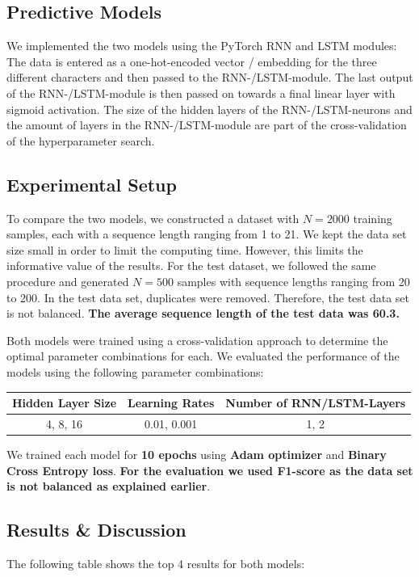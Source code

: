 \documentclass[12pt,a4paper]{article}
\begin{document}
\subsection{Predictive Models}
We implemented the two models using the PyTorch RNN and LSTM modules:
The data is entered as a one-hot-encoded vector / embedding for the three different characters and then passed to the RNN-/LSTM-module. The last output of the RNN-/LSTM-module is then passed on towards a final linear layer with sigmoid activation. The size of the hidden layers of the RNN-/LSTM-neurons and the amount of layers in the RNN-/LSTM-module are part of the cross-validation of the hyperparameter search.
\subsection{Experimental Setup}
To compare the two models, we constructed a dataset with $N=2000$ training samples, each with a sequence length ranging from 1 to 21. We kept the data set size small in order to limit the computing time. However, this limits the informative value of the results. For the test dataset, we followed the same procedure and generated $N=500$ samples with sequence lengths ranging from 20 to 200. In the test data set, duplicates were removed. Therefore, the test data set is not balanced. \textbf{The average sequence length of the test data was 60.3.}

Both models were trained using a cross-validation approach to determine the optimal parameter combinations for each. We evaluated the performance of the models using the following parameter combinations:
\begin{center}
    \begin{tabular}{|c|c|c|}
\hline
Hidden Layer Size & Learning Rates & Number of RNN/LSTM-Layers \\
\hline
4, 8, 16 & 0.01, 0.001 & 1, 2 \\
\hline
\end{tabular}
\end{center}

We trained each model for \textbf{10 epochs} using \textbf{Adam optimizer} and \textbf{Binary Cross Entropy loss}. \textbf{For the evaluation we used F1-score as the data set is not balanced as explained earlier}.
\subsection{Results \& Discussion}
The following table shows the top 4 results for both models: \\
\end{document}

